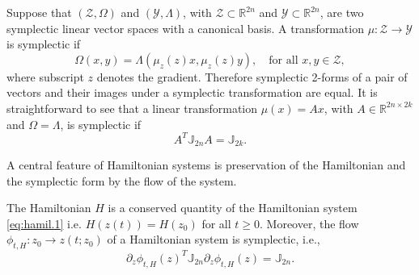 Suppose that $(\mathcal Z,\Omega)$ and $(\mathcal Y,\Lambda)$, with $\mathcal Z \subset \mathbb R^{2n}$ and $\mathcal Y \subset \mathbb R^{2n}$, are two symplectic linear vector spaces with a canonical basis. A transformation $\mu:\mathcal Z\to\mathcal Y$ is symplectic if
\begin{equation} \label{eq:hamil.3}
	\Omega(x,y) = \Lambda(\mu_z(z)x,\mu_z(z)y), \quad \text{for all } x,y\in\mathcal Z,
\end{equation}
where subscript $z$ denotes the gradient. Therefore symplectic 2-forms of a pair of vectors and their images under a symplectic transformation are equal. It is straightforward to see that a linear transformation $\mu(x) = Ax$, with $A\in \mathbb R^{2n\times 2k}$ and $\Omega = \Lambda$, is symplectic if
\begin{equation} \label{eq:hamil.4}
	A^T \mathbb J_{2n} A = \mathbb J_{2k}.
\end{equation}


A central feature of Hamiltonian systems is preservation of the Hamiltonian and the symplectic form by the flow of the system.
\begin{theorem} \label{thm:1}
\cite{Marsden:2010:IMS:1965128} The Hamiltonian $H$ is a conserved quantity of the Hamiltonian system \eqref{eq:hamil.1} i.e. $H(z(t)) = H(z_0)$ for all $t \geq 0$. Moreover, the flow $\phi_{t,H}:z_0 \to z(t;z_0)$ of a Hamiltonian system is symplectic, i.e.,
$$\partial_z \phi_{t,H}(z)^T \mathbb J_{2n} \partial_z \phi_{t,H}(z) = \mathbb J_{2n}.$$
\end{theorem}

